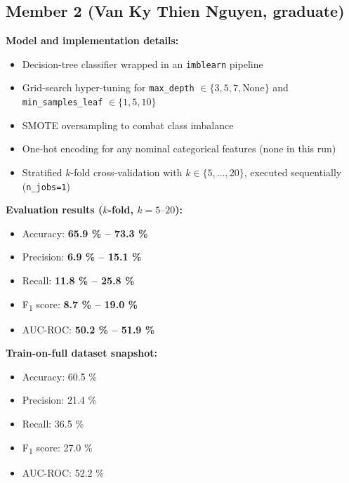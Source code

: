 \documentclass[11pt,a4paper]{article}
\begin{document}
\subsection{Member 2 (Van Ky Thien Nguyen, graduate)}

\begin{tcolorbox}[%
        title=Decision Tree Classifier Implementation,
        colback=lightpurple!30,
        colframe=mediumpurple,
        boxrule=0.5pt,
        fonttitle=\bfseries\sffamily\footnotesize,
        fontupper=\footnotesize
    ]
    \textbf{Model and implementation details:}
    \begin{itemize}[leftmargin=*, itemsep=2pt, parsep=0pt]
        \item Decision-tree classifier wrapped in an \texttt{imblearn} pipeline
        \item Grid-search hyper-tuning for \verb|max_depth| $\in\{3,5,7,\text{None}\}$ and \verb|min_samples_leaf| $\in\{1,5,10\}$
        \item SMOTE oversampling to combat class imbalance
        \item One-hot encoding for any nominal categorical features (none in this run)
        \item Stratified $k$-fold cross-validation with $k\in\{5,\dots,20\}$, executed sequentially (\verb|n_jobs=1|)
    \end{itemize}

    \textbf{Evaluation results ($k$-fold, $k=5\text{–}20$):}
    \begin{itemize}[leftmargin=*, itemsep=2pt, parsep=0pt]
        \item Accuracy: \textbf{65.9 \% – 73.3 \%}
        \item Precision: \textbf{6.9 \% – 15.1 \%}
        \item Recall: \textbf{11.8 \% – 25.8 \%}
        \item F\textsubscript{1} score: \textbf{8.7 \% – 19.0 \%}
        \item AUC-ROC: \textbf{50.2 \% – 51.9 \%}
    \end{itemize}

    \textbf{Train-on-full dataset snapshot:}
    \begin{itemize}[leftmargin=*, itemsep=2pt, parsep=0pt]
        \item Accuracy: 60.5 \%
        \item Precision: 21.4 \%
        \item Recall: 36.5 \%
        \item F\textsubscript{1} score: 27.0 \%
        \item AUC-ROC: 52.2 \%
    \end{itemize}
\end{tcolorbox}
\end{document}
